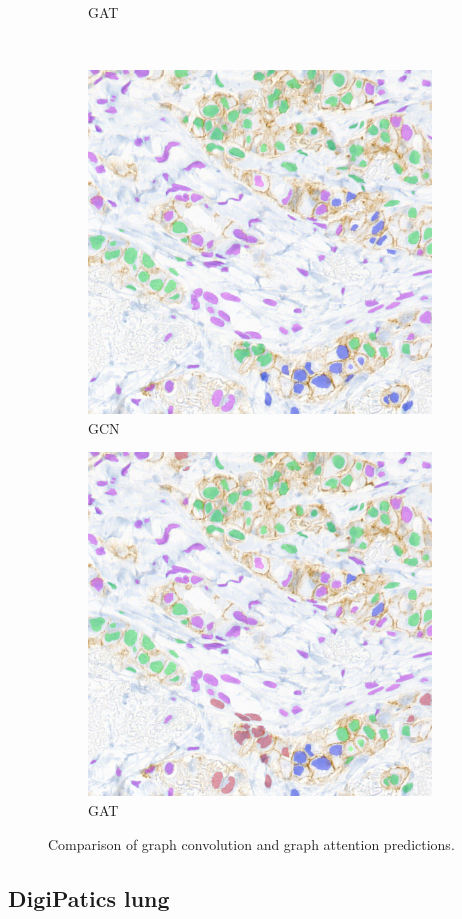 \begin{figure}[H]
\begin{subfigure}[b]{0.45\textwidth}
    \caption{GAT}
  \end{subfigure}
  \\
  \begin{subfigure}[b]{0.45\textwidth}
    \includegraphics[width=\textwidth]{imgs/qual/breast/gcn-full3.png}
    \caption{GCN}
  \end{subfigure}
  \hfill
  \begin{subfigure}[b]{0.45\textwidth}
    \includegraphics[width=\textwidth]{imgs/qual/breast/gat-full3.png}
    \caption{GAT}
  \end{subfigure}
    \caption{Comparison of graph convolution and graph attention predictions.}
    \label{fig:breast-ex2}
\end{figure}

\newpage
\subsection{DigiPatics lung}
